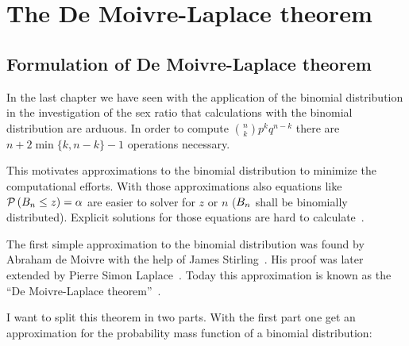 \chapter{The De Moivre-Laplace theorem}

\section{Formulation of De Moivre-Laplace theorem}



In the last chapter we have seen with the application of the binomial distribution in the investigation of the sex ratio that calculations with the binomial distribution are arduous. In order to compute $\binom nk p^kq^{n-k}$ there are $n+2\min\{k,n-k\}-1$ operations necessary.

This motivates approximations to the binomial distribution to minimize the computational efforts. With those approximations also equations like $\mathcal P\left({B_{n} \le z}\right)=\alpha$ are easier to solver for $z$ or $n$ ($B_{n}$ shall be binomially distributed). Explicit solutions for those equations are hard to calculate~\cite[p. 469]{hald1}.

The first simple approximation to the binomial distribution was found by Abraham de Moivre with the help of James Stirling~\cite[p. 469]{hald1}. His proof was later extended by Pierre Simon Laplace~\cite[pp. 495 ff.]{hald1}. Today this approximation is known as the ``De Moivre-Laplace theorem''~\cite[pp. 64-67]{irle}.

I want to split this theorem in two parts. With the first part one get an approximation for the probability mass function of a binomial distribution:

